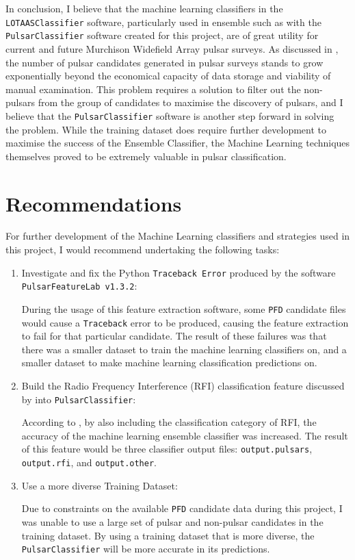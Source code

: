 \documentclass{article}
\begin{document}
In conclusion, I believe that the machine learning classifiers in the \\\verb|LOTAASClassifier| software, particularly used in ensemble such as with the \verb|PulsarClassifier| software created for this project, are of great utility for current and future Murchison Widefield Array pulsar surveys. As discussed in \textcite{lyon}, the number of pulsar candidates generated in pulsar surveys stands to grow exponentially beyond the economical capacity of data storage and viability of manual examination. This problem requires a solution to filter out the non-pulsars from the group of candidates to maximise the discovery of pulsars, and I believe that the \verb|PulsarClassifier| software is another step forward in solving the problem. While the training dataset does require further development to maximise the success of the Ensemble Classifier, the Machine Learning techniques themselves proved to be extremely valuable in pulsar classification.


\pagebreak
\section{Recommendations}

For further development of the Machine Learning classifiers and strategies used in this project, I would recommend undertaking the following tasks:

\begin{enumerate}
    \item Investigate and fix the Python \verb|Traceback Error| produced by the software \verb|PulsarFeatureLab v1.3.2|:

    During the usage of this feature extraction software, some \verb|PFD| candidate files would cause a \verb|Traceback| error to be produced, causing the feature extraction to fail for that particular candidate. The result of these failures was that there was a smaller dataset to train the machine learning classifiers on, and a smaller dataset to make machine learning classification predictions on.

    \item Build the Radio Frequency Interference (RFI) classification feature discussed by \textcite{tan} into \verb|PulsarClassifier|:
    
    According to \textcite{tan}, by also including the classification category of RFI, the accuracy of the machine learning ensemble classifier was increased. The result of this feature would be three classifier output files: \verb|output.pulsars|, \verb|output.rfi|, and \verb|output.other|.

    \item Use a more diverse Training Dataset:

    Due to constraints on the available \verb|PFD| candidate data during this project, I was unable to use a large set of pulsar and non-pulsar candidates in the training dataset. By using a training dataset that is more diverse, the \verb|PulsarClassifier| will be more accurate in its predictions.
\end{enumerate}
\end{document}
